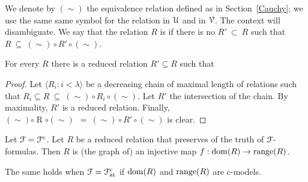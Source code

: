 \documentclass{amsproc}
\renewcommand*{\emph}[1]{%
   \smash{\tikz[baseline]\node[rectangle, fill=teal!25, rounded corners, inner xsep=0.5ex, inner ysep=0.2ex, anchor=base, minimum height = 2.7ex]{\strut #1};}}
\begin{document}
{We denote by $(\sim)$ the equivalence relation defined as in Section~\ref{Cauchy}; we use the same same symbol for the relation in ${\EuScript U}$ and in ${\EuScript V}$.
The context will disambiguate.
We say that the relation $R$ is \emph{reduced\/} if there is no $R'\ \subset\ R$ such that $R\ \subseteq\ \mathrel{(\sim)}\circ \mathrel{R'}\circ\mathrel{(\sim)}$.

\begin{fact}
  For every $R$ there is a reduced relation $R'\subseteq R$ such that 
  
\end{fact}

\begin{proof}
  Let $\langle R_i:i<\lambda\rangle$ be a decreasing chain of maximal length of relations such that $R_i\mathrel{\subseteq}R\ \subseteq\ \mathrel{(\sim)}\circ \mathrel{R_i}\circ\mathrel{(\sim)}$.
  Let  $R'$ the intersection  of the chain.
  By maximality, $R'$ is a reduced relation.
  Finally, $\mathrel{(\sim)}\circ \mathrel{R}\circ\mathrel{(\sim)}\ \ =\ \mathrel{(\sim)}\circ \mathrel{R'}\circ\mathrel{(\sim)}$ is clear.
\end{proof}




\begin{fact}\label{fact_reduced_funct} 
  Let ${\EuScript F}={\EuScript F}^{\rm c}$.
  Let $R$ be a reduced relation that preserves of the truth of ${\EuScript F}$-formulas.
  Then $R$ is (the graph of) an injective map $f:{\rm dom}(R)\to{\rm range}(R)$.

  The same holds when ${\EuScript F}={\EuScript F}^{\rm c}_{\rm at}$ if ${\rm dom}(R)$ and ${\rm range}(R)$ are c-models.
\end{fact}

}
\end{document}
